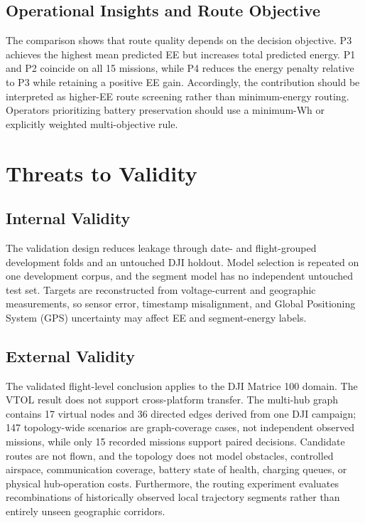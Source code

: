 \documentclass[conference,a4paper]{IEEEtran}
\begin{document}
\subsection{Operational Insights and Route Objective}
The comparison shows that route quality depends on the decision objective. P3 achieves the highest mean predicted EE but increases total predicted energy. P1 and P2 coincide on all 15 missions, while P4 reduces the energy penalty relative to P3 while retaining a positive EE gain. Accordingly, the contribution should be interpreted as higher-EE route screening rather than minimum-energy routing. Operators prioritizing battery preservation should use a minimum-Wh or explicitly weighted multi-objective rule.

\section{Threats to Validity}

\subsection{Internal Validity}
The validation design reduces leakage through date- and flight-grouped development folds and an untouched DJI holdout. Model selection is repeated on one development corpus, and the segment model has no independent untouched test set. Targets are reconstructed from voltage-current and geographic measurements, so sensor error, timestamp misalignment, and Global Positioning System (GPS) uncertainty may affect EE and segment-energy labels.

\subsection{External Validity}
The validated flight-level conclusion applies to the DJI Matrice 100 domain. The VTOL result does not support cross-platform transfer. The multi-hub graph contains 17 virtual nodes and 36 directed edges derived from one DJI campaign; 147 topology-wide scenarios are graph-coverage cases, not independent observed missions, while only 15 recorded missions support paired decisions. Candidate routes are not flown, and the topology does not model obstacles, controlled airspace, communication coverage, battery state of health, charging queues, or physical hub-operation costs. Furthermore, the routing experiment evaluates recombinations of historically observed local trajectory segments rather than entirely unseen geographic corridors.
\end{document}
